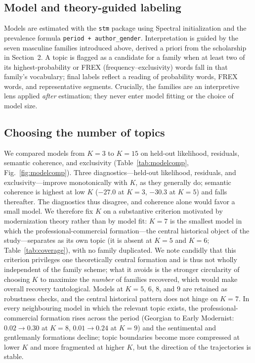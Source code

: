 \documentclass[11pt]{article}
\begin{document}
\subsection{Model and theory-guided labeling}
Models are estimated with the \texttt{stm} package \citep{roberts2019stm} using
Spectral initialization and the prevalence formula \texttt{period +
author\_gender}. Interpretation is guided by the seven masculine families
introduced above, derived a priori from the scholarship in Section~2. A topic is
flagged as a candidate for a family when at least two of its highest-probability
or FREX (frequency--exclusivity) words fall in that family's vocabulary; final
labels reflect a reading of probability words, FREX words, and representative
segments. Crucially, the families are an interpretive lens applied \emph{after}
estimation; they never enter model fitting or the choice of model size.

\subsection{Choosing the number of topics}
\label{sec:modelsel}
We compared models from $K=3$ to $K=15$ on held-out likelihood, residuals,
semantic coherence, and exclusivity (Table~\ref{tab:modelcomp},
Fig.~\ref{fig:modelcomp}). Three diagnostics---held-out likelihood, residuals,
and exclusivity---improve monotonically with $K$, as they generally do; semantic
coherence is highest at low $K$ ($-27.0$ at $K=3$, $-30.3$ at $K=5$) and falls
thereafter. The diagnostics thus disagree, and coherence alone would favor a
small model. We therefore fix $K$ on a substantive criterion motivated by
modernization theory rather than by model fit: $K=7$ is the smallest model in which the professional-commercial
formation---the central historical object of the study---separates as its own
topic (it is absent at $K=5$ and $K=6$; Table~\ref{tab:coverage}), with no family
duplicated. We note candidly that this criterion privileges one theoretically
central formation and is thus not wholly independent of the family scheme; what
it avoids is the stronger circularity of choosing $K$ to maximize the
\emph{number} of families recovered, which would make overall recovery
tautological. Models at $K=5$, $6$, $8$, and $9$ are retained as robustness
checks, and the central historical pattern does not hinge on $K=7$. In every
neighbouring model in which the relevant topic exists, the professional-commercial
formation rises across the period (Georgian to Early Modernist:
$0.02\rightarrow0.30$ at $K=8$, $0.01\rightarrow0.24$ at $K=9$) and the
sentimental and gentlemanly formations decline; topic boundaries become more
compressed at lower $K$ and more fragmented at higher $K$, but the direction of
the trajectories is stable.
\end{document}
